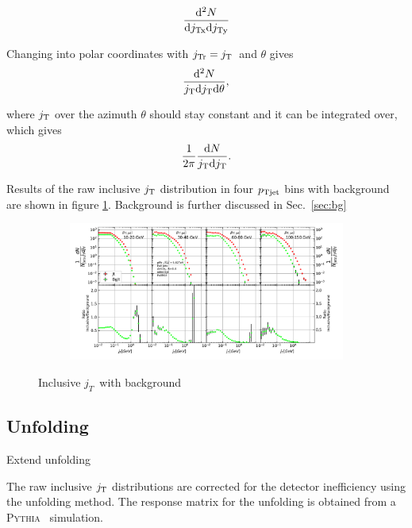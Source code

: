  \begin{equation}
 \frac{\mathrm{d}^2N}{\mathrm{d} j_{\rm Tx} \mathrm{d} j_{\rm Ty}}
 \end{equation}

 Changing into polar coordinates with $j_{\rm Tr} = j_{\rm T}$ and $\theta$ gives
 \begin{equation}
 \frac{\mathrm{d}^2N}{j_{\rm T} \mathrm{d} j_{\rm T} \mathrm{d} \theta},
 \end{equation}

where $j_{\rm T}$ over the azimuth $\theta$ should stay constant and it can be integrated over, which gives 
\begin{equation}
\frac{1}{2\pi}\frac{\mathrm{d}N}{j_{\rm T} \mathrm{d} j_{\rm T}}.
 \end{equation}

Results of the raw inclusive $j_{\rm T}$ distribution in four $p_{\rm Tjet}$ bins with background are shown in figure \ref{fig:inclusive}. Background is further discussed in Sec.~\ref{sec:bg}
 
 \begin{figure}
\centering
\begin{subfigure}{0.95\textwidth}
\includegraphics[width=\textwidth]{results/MixedFullJetsR04JetConeJtInclusive.pdf}
\end{subfigure}
\caption{Inclusive $j_T$ with background}
\label{fig:inclusive}
\end{figure}
 
 
 
 \subsection{Unfolding}
{\color{red} Extend unfolding}
 
The raw inclusive $j_{\rm T}$ distributions are corrected for the detector inefficiency using the unfolding method. The response matrix for the unfolding is obtained from a \textsc{Pythia}~\cite{introPythia81} simulation.
 
